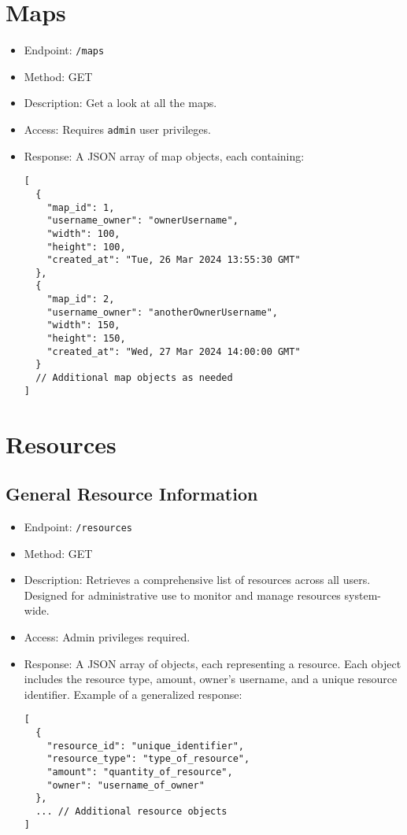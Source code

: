 \documentclass[12pt]{article}
\begin{document}
\section{Maps}
\begin{itemize}
    \item Endpoint: \texttt{/maps}
    \item Method: GET
    \item Description: Get a look at all the maps.
    \item Access: Requires \texttt{admin} user privileges.
    \item Response: A JSON array of map objects, each containing:
    \begin{verbatim}
[
  {
    "map_id": 1,
    "username_owner": "ownerUsername",
    "width": 100,
    "height": 100,
    "created_at": "Tue, 26 Mar 2024 13:55:30 GMT"
  },
  {
    "map_id": 2,
    "username_owner": "anotherOwnerUsername",
    "width": 150,
    "height": 150,
    "created_at": "Wed, 27 Mar 2024 14:00:00 GMT"
  }
  // Additional map objects as needed
]
    \end{verbatim}
\end{itemize}

\section{Resources}
\subsection{General Resource Information}
\begin{itemize}
    \item Endpoint: \texttt{/resources}
    \item Method: GET
    \item Description: Retrieves a comprehensive list of resources across all users. Designed for administrative use to monitor and manage resources system-wide.
    \item Access: Admin privileges required.
    \item Response: A JSON array of objects, each representing a resource. Each object includes the resource type, amount, owner's username, and a unique resource identifier. Example of a generalized response:
    \begin{verbatim}
[
  {
    "resource_id": "unique_identifier",
    "resource_type": "type_of_resource",
    "amount": "quantity_of_resource",
    "owner": "username_of_owner"
  },
  ... // Additional resource objects
]
    \end{verbatim}
\end{itemize}
\end{document}
